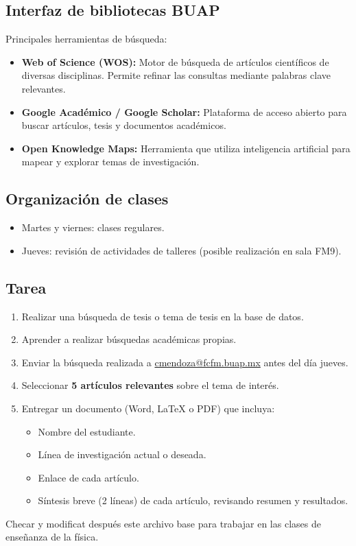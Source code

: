 \documentclass{article}
\begin{document}
\subsection{Interfaz de bibliotecas BUAP} \vspace{0.5cm}

Principales herramientas de búsqueda:
\begin{itemize}
	\item \textbf{Web of Science (WOS):} Motor de búsqueda de artículos científicos de diversas disciplinas. Permite refinar las consultas mediante palabras clave relevantes.
	\item \textbf{Google Académico / Google Scholar:} Plataforma de acceso abierto para buscar artículos, tesis y documentos académicos.
	\item \textbf{Open Knowledge Maps:} Herramienta que utiliza inteligencia artificial para mapear y explorar temas de investigación.
\end{itemize}

\subsection{Organización de clases} \vspace{0.5cm}
\begin{itemize}
	\item Martes y viernes: clases regulares.
	\item Jueves: revisión de actividades de talleres (posible realización en sala FM9).
\end{itemize}

\subsection{Tarea} \vspace{0.5cm}

\begin{enumerate}
	\item Realizar una búsqueda de tesis o tema de tesis en la base de datos.
	\item Aprender a realizar búsquedas académicas propias.
	\item Enviar la búsqueda realizada a \href{mailto:cmendoza@fcfm.buap.mx}{cmendoza@fcfm.buap.mx} antes del día jueves.
	\item Seleccionar \textbf{5 artículos relevantes} sobre el tema de interés.
	\item Entregar un documento (Word, LaTeX o PDF) que incluya:
	\begin{itemize}
		\item Nombre del estudiante.
		\item Línea de investigación actual o deseada.
		\item Enlace de cada artículo.
		\item Síntesis breve (2 líneas) de cada artículo, revisando resumen y resultados.
	\end{itemize}
\end{enumerate} \vspace{0.5cm}

Checar y modificat después este archivo base para trabajar en las clases de enseñanza de la física. \vspace{0.5cm}
\end{document}
